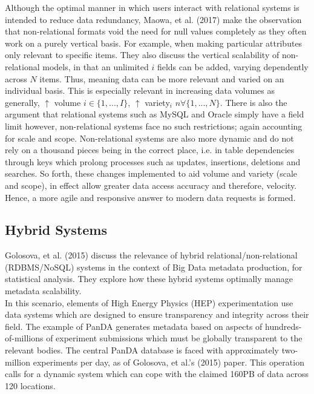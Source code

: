 \documentclass[11pt, english]{article}
\begin{document}
	Although the optimal manner in which users interact with relational systems is intended to reduce data redundancy, Maowa, et al. (2017) make the observation that non-relational formats void the need for null values completely as they often work on a purely vertical basis. For example, when making particular attributes only relevant to specific items. They also discuss the vertical scalability of non-relational models, in that an unlimited $i$ fields can be added, varying dependently across $N$ items. Thus, meaning data can be more relevant and varied on an individual basis. This is especially relevant in increasing data volumes as generally, $\uparrow$ volume $i\in \{1,...,I\}$, $\uparrow$ variety$_{i}$ $n\forall\{1,...,N\}$. There is also the argument that relational systems such as MySQL and Oracle simply have a field limit however, non-relational systems face no such restrictions; again accounting for scale and scope. Non-relational systems are also more dynamic and do not rely on a thousand pieces being in the correct place, i.e. in table dependencies through keys which prolong processes such as updates, insertions, deletions and searches. So forth, these changes implemented to aid volume and variety (scale and scope), in effect allow greater data access accuracy and therefore, velocity. Hence, a more agile and responsive answer to modern data requests is formed.

	\subsection{Hybrid Systems}

	Golosova, et al. (2015) discuss the relevance of hybrid relational/non-relational (RDBMS/NoSQL) systems in the context of Big Data metadata production, for statistical analysis. They explore how these hybrid systems optimally manage metadata scalability.\\

	In this scenario, elements of High Energy Physics (HEP) experimentation use data systems which are designed to ensure transparency and integrity across their field. The example of PanDA generates metadata based on aspects of hundreds-of-millions of experiment submissions which must be globally transparent to the relevant bodies. The central PanDA database is faced with approximately two-million experiments per day, as of Golosova, et al.'s (2015) paper. This operation calls for a dynamic system which can cope with the claimed 160PB of data across 120 locations.
\end{document}
